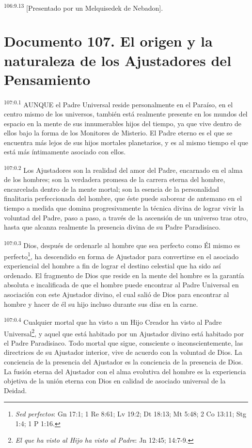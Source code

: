 \documentclass[twoside, 11pt]{book}
\begin{document}
\par
\textsuperscript{106:9.13} [Presentado por un Melquisedek de Nebadon].


\chapter{Documento 107. El origen y la naturaleza de los Ajustadores del Pensamiento}
\par
\textsuperscript{107:0.1} AUNQUE el Padre Universal reside personalmente en el Paraíso, en el centro mismo de los universos, también está realmente presente en los mundos del espacio en la mente de sus innumerables hijos del tiempo, ya que vive dentro de ellos bajo la forma de los Monitores de Misterio. El Padre eterno es el que se encuentra más lejos de sus hijos mortales planetarios, y es al mismo tiempo el que está más íntimamente asociado con ellos.

\par
\textsuperscript{107:0.2} Los Ajustadores son la realidad del amor del Padre, encarnado en el alma de los hombres; son la verdadera promesa de la carrera eterna del hombre, encarcelada dentro de la mente mortal; son la esencia de la personalidad finalitaria perfeccionada del hombre, que éste puede saborear de antemano en el tiempo a medida que domina progresivamente la técnica divina de lograr vivir la voluntad del Padre, paso a paso, a través de la ascensión de un universo tras otro, hasta que alcanza realmente la presencia divina de su Padre Paradisiaco.

\par
\textsuperscript{107:0.3} Dios, después de ordenarle al hombre que sea perfecto como Él mismo es perfecto\footnote{\textit{Sed perfectos}: Gn 17:1; 1 Re 8:61; Lv 19:2; Dt 18:13; Mt 5:48; 2 Co 13:11; Stg 1:4; 1 P 1:16.}, ha descendido en forma de Ajustador para convertirse en el asociado experiencial del hombre a fin de lograr el destino celestial que ha sido así ordenado. El fragmento de Dios que reside en la mente del hombre es la garantía absoluta e incalificada de que el hombre puede encontrar al Padre Universal en asociación con este Ajustador divino, el cual salió de Dios para encontrar al hombre y hacer de él su hijo incluso durante sus días en la carne.

\par
\textsuperscript{107:0.4} Cualquier mortal que ha visto a un Hijo Creador ha visto al Padre Universal\footnote{\textit{El que ha visto al Hijo ha visto al Padre}: Jn 12:45; 14:7-9.}, y aquel que está habitado por un Ajustador divino está habitado por el Padre Paradisiaco. Todo mortal que sigue, consciente o inconscientemente, las directrices de su Ajustador interior, vive de acuerdo con la voluntad de Dios. La conciencia de la presencia del Ajustador es la conciencia de la presencia de Dios. La fusión eterna del Ajustador con el alma evolutiva del hombre es la experiencia objetiva de la unión eterna con Dios en calidad de asociado universal de la Deidad.
\end{document}
